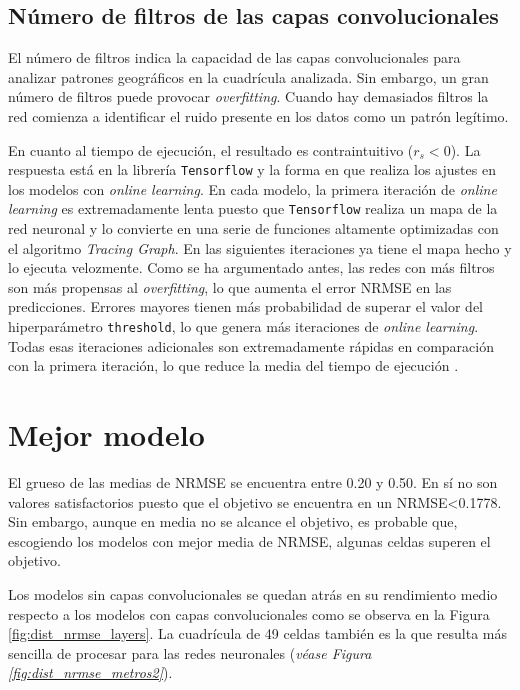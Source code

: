 \subsection{Número de filtros de las capas convolucionales}
El número de filtros indica la capacidad de las capas convolucionales para analizar patrones geográficos en la cuadrícula analizada. Sin embargo, un gran número de filtros puede provocar \textit{overfitting}. Cuando hay demasiados filtros la red comienza a identificar el ruido presente en los datos como un patrón legítimo.

En cuanto al tiempo de ejecución, el resultado es contraintuitivo ($r_s<0$). La respuesta está en la librería \texttt{Tensorflow} y la forma en que realiza los ajustes en los modelos con \textit{online learning}. En cada modelo, la primera iteración de \textit{online learning} es extremadamente lenta puesto que \texttt{Tensorflow} realiza un mapa de la red neuronal y lo convierte en una serie de funciones altamente optimizadas con el algoritmo \textit{Tracing Graph}. En las siguientes iteraciones ya tiene el mapa hecho y lo ejecuta velozmente. Como se ha argumentado antes, las redes con más filtros son más propensas al \textit{overfitting}, lo que aumenta el error NRMSE en las predicciones. Errores mayores tienen más probabilidad de superar el valor del hiperparámetro \texttt{threshold}, lo que genera más iteraciones de \textit{online learning}. Todas esas iteraciones adicionales son extremadamente rápidas en comparación con la primera iteración, lo que reduce la media del tiempo de ejecución \cite{machinelearningbook1,tffunction}.






\section{Mejor modelo}
\label{cap4.3:bestmodel}
El grueso de las medias de NRMSE se encuentra entre 0.20 y 0.50. En sí no son valores satisfactorios puesto que el objetivo se encuentra en un NRMSE<0.1778. Sin embargo, aunque en media no se alcance el objetivo, es probable que, escogiendo los modelos con mejor media de NRMSE, algunas celdas superen el objetivo.


Los modelos sin capas convolucionales se quedan atrás en su rendimiento medio respecto a los modelos con capas convolucionales como se observa en la Figura \ref{fig:dist_nrmse_layers}. La cuadrícula de 49 celdas también es la que resulta más sencilla de procesar para las redes neuronales (\textit{véase Figura \ref{fig:dist_nrmse_metros2}}).

